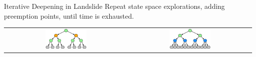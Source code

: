 \documentclass[xcolor=dvipsnames]{beamer}
\begin{document}
\begin{frame}{Iterative Deepening in Landslide}
	Repeat state space explorations, adding preemption points, until time is exhausted.
	\vspace{0.15in}
	\begin{center}
		\begin{tabular}{cc}
			\includegraphics[width=0.35\textwidth]{tree1.pdf} &
			\includegraphics[width=0.35\textwidth]{tree2.pdf}
		\end{tabular}
	\end{center}
\end{frame}
\end{document}
